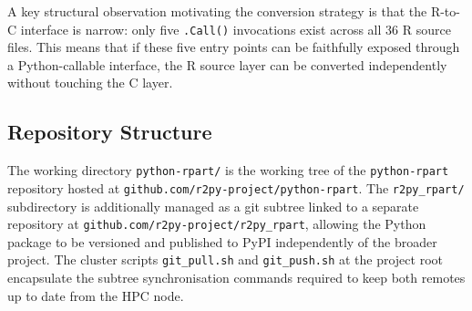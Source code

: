 \documentclass[12pt]{article}
\begin{document}
A key structural observation motivating the conversion strategy is that the R-to-C interface is narrow: only five \texttt{.Call()} invocations exist across all 36 R source files. This means that if these five entry points can be faithfully exposed through a Python-callable interface, the R source layer can be converted independently without touching the C layer.

\subsection{Repository Structure}
\label{sec:intro:repo}

The working directory \texttt{python-rpart/} is the working tree of the \texttt{python-rpart} repository hosted at \texttt{github.com/r2py-project/python-rpart}. The \texttt{r2py\_rpart/} subdirectory is additionally managed as a git subtree linked to a separate repository at \texttt{github.com/r2py-project/r2py\_rpart}, allowing the Python package to be versioned and published to PyPI independently of the broader project. The cluster scripts \texttt{git\_pull.sh} and \texttt{git\_push.sh} at the project root encapsulate the subtree synchronisation commands required to keep both remotes up to date from the HPC node.
\end{document}
